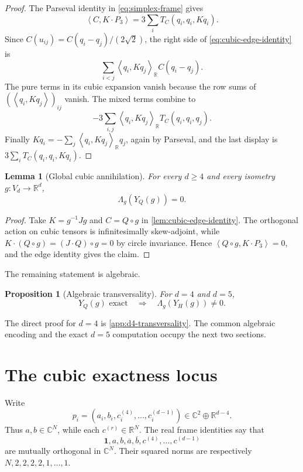 \documentclass[11pt,reqno]{amsart}
\newtheorem{proposition}[theorem]{Proposition}
\newtheorem{lemma}[theorem]{Lemma}
\theoremstyle{remark}
\newcommand{\R}{\mathbb R}
\newcommand{\C}{\mathbb C}
\newcommand{\one}{\mathbf 1}
\newcommand{\ip}[2]{\left\langle #1,#2\right\rangle}
\begin{document}
\begin{proof}
The Parseval identity in \eqref{eq:simplex-frame} gives
\[
 \ip{C}{K\cdot P_3}=3\sum_iT_C(q_i,q_i,Kq_i).
\]
Since $C(u_{ij})=C(q_i-q_j)/(2\sqrt2)$, the right side of
\eqref{eq:cubic-edge-identity} is
\[
 \sum_{i<j}\ip{q_i}{Kq_j}_{\R}C(q_i-q_j).
\]
The pure terms in its cubic expansion vanish because the row sums of
$(\ip{q_i}{Kq_j})_{ij}$ vanish.  The mixed terms combine to
\[
 -3\sum_{i,j}\ip{q_i}{Kq_j}_{\R}T_C(q_i,q_i,q_j).
\]
Finally $Kq_i=-\sum_j\ip{q_i}{Kq_j}_{\R}q_j$, again by Parseval, and the
last display is $3\sum_iT_C(q_i,q_i,Kq_i)$.
\end{proof}

\begin{lemma}[Global cubic annihilation]\label{lem:global-annihilation}
For every $d\ge4$ and every isometry $g:V_d\to\R^d$,
\begin{equation}\label{eq:global-annihilation}
 \Lambda_g(Y_Q(g))=0.
\end{equation}
\end{lemma}

\begin{proof}
Take $K=g^{-1}Jg$ and $C=Q\circ g$ in
\cref{lem:cubic-edge-identity}.  The orthogonal action on cubic tensors is
infinitesimally skew-adjoint, while
$K\cdot(Q\circ g)=(J\cdot Q)\circ g=0$ by circle invariance.  Hence
$\ip{Q\circ g}{K\cdot P_3}=0$, and the edge identity gives the claim.
\end{proof}

The remaining statement is algebraic.

\begin{proposition}[Algebraic transversality]\label{prop:transversality}
For $d=4$ and $d=5$,
\begin{equation}\label{eq:transversality}
 Y_Q(g)\text{ exact}
 \quad\Longrightarrow\quad
 \Lambda_g(Y_H(g))\ne0.
\end{equation}
\end{proposition}

The direct proof for $d=4$ is \cref{app:d4-transversality}.  The common
algebraic encoding and the exact $d=5$ computation occupy the next two
sections.

\section{The cubic exactness locus}\label{sec:exactness-locus}

Write
\[
 p_i=(a_i,b_i,c_i^{(4)},\ldots,c_i^{(d-1)})
 \in\C^2\oplus\R^{d-4}.
\]
Thus $a,b\in\C^N$, while each $c^{(r)}\in\R^N$.  The real frame identities
say that
\[
 \one,a,b,\overline a,\overline b,c^{(4)},\ldots,c^{(d-1)}
\]
are mutually orthogonal in $\C^N$.  Their squared norms are respectively
$N,2,2,2,2,1,\ldots,1$.
\end{document}
